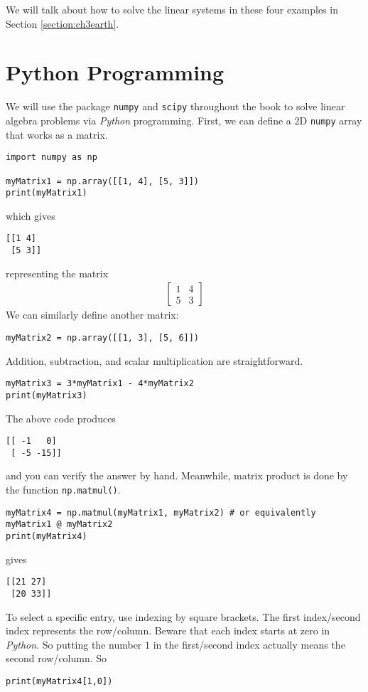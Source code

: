 We will talk about how to solve the linear systems in these four examples in Section \ref{section:ch3earth}.

\section{Python Programming}
We will use the package \texttt{numpy} and \texttt{scipy} throughout the book to solve linear algebra problems via \textit{Python} programming. First, we can define a 2D \texttt{numpy} array that works as a matrix.
\begin{lstlisting}
import numpy as np

myMatrix1 = np.array([[1, 4], [5, 3]])
print(myMatrix1)
\end{lstlisting}
which gives
\begin{lstlisting}
[[1 4]
 [5 3]]
\end{lstlisting}
representing the matrix
\begin{align*}
\begin{bmatrix}
1 & 4 \\
5 & 3
\end{bmatrix}
\end{align*}
We can similarly define another matrix:
\begin{lstlisting}
myMatrix2 = np.array([[1, 3], [5, 6]])
\end{lstlisting}
Addition, subtraction, and scalar multiplication are straightforward.
\begin{lstlisting}
myMatrix3 = 3*myMatrix1 - 4*myMatrix2
print(myMatrix3)
\end{lstlisting}
The above code produces
\begin{lstlisting}
[[ -1   0]
 [ -5 -15]]
\end{lstlisting}
and you can verify the answer by hand. Meanwhile, matrix product is done by the function \texttt{np.matmul()}.
\begin{lstlisting}
myMatrix4 = np.matmul(myMatrix1, myMatrix2) # or equivalently myMatrix1 @ myMatrix2
print(myMatrix4)
\end{lstlisting}
gives
\begin{lstlisting}
[[21 27]
 [20 33]]
\end{lstlisting}
To select a specific entry, use indexing by square brackets. The first index/second index represents the row/column. Beware that each index starts at zero in \textit{Python}. So putting the number $1$ in the first/second index actually means the second row/column. So
\begin{lstlisting}
print(myMatrix4[1,0])
\end{lstlisting}
